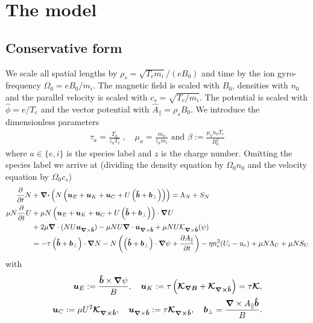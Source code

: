\section{The model} \label{sec:model}
\subsection{Conservative form}
We scale all spatial lengths by $\rho_s = \sqrt{T_e m_i}/(eB_0)$ and time by the ion gyro-frequency $\Omega_0 = eB_0/m_i$.
The magnetic field is scaled with $B_0$, densities with $n_0$ and the parallel velocity is scaled with $c_s = \sqrt{T_e/m_i}$.
The potential is scaled with $\hat \phi = e/T_e$ and the vector potential with
$\hat A_\parallel = \rho_s B_0$.
We introduce the dimensionless parameters
\begin{align}
  \tau_a = \frac{T_a}{z_aT_e}~,\quad \mu_a = \frac{m_a}{z_am_i}\text{ and }
  \beta:=\frac{\mu_0 n_0 T_e}{B_0^2}
  \label{}
\end{align}
where $a\in\{e,i\}$ is the species label and $z$ is the charge number.
Omitting the species label we arrive at (dividing the density equation by $\Omega_0n_0$ and the velocity equation by $\Omega_0 c_s$)
\begin{align}
\frac{\partial}{\partial t} N &+ {\boldsymbol{{\boldsymbol{\nabla}}\cdot}}\left( N \left(
    {\boldsymbol{u}}_E + {\boldsymbol{u}}_K + {\boldsymbol{u}}_{C} + U\left(\bm{\hat{b}} + {{\boldsymbol{b}}}_\perp\right)\right)\right) = \Lambda_N + S_N \\
\mu N \frac{\partial}{\partial t} U &+ \mu N \left(
    {\boldsymbol{u}}_E + {\boldsymbol{u}}_K + {\boldsymbol{u}}_{C} + U\left(\bm{\hat{b}} + {{\boldsymbol{b}}}_\perp\right)
    \right)\cdot{\boldsymbol{\nabla}} U  \nonumber \\
    &+ 2\mu {\boldsymbol{\nabla}}\cdot ( NU {\boldsymbol{u}}_{{\boldsymbol{\nabla}}\times\bm{\hat{b}}})
    -\mu NU{\boldsymbol{\nabla}}\cdot {\boldsymbol{u}}_{{\boldsymbol{\nabla}}\times\bm{\hat{b}}}
    + \mu NU\mathcal K_{{\boldsymbol{\nabla}}\times\bm{\hat{b}}}(\psi) \nonumber\\
    &= -\tau \left(\bm{\hat{b}} + {{\boldsymbol{b}}}_\perp\right)\cdot{\boldsymbol{\nabla}} N
    -N \left( \left(\bm{\hat{b}}+{{\boldsymbol{b}}}_\perp\right)\cdot{\boldsymbol{\nabla}} \psi + \frac{\partial A_\parallel}{\partial t}\right)
    - \eta n_e^2(U_i-u_e) + \mu N\Lambda_U + \mu N S_U
\label{}
\end{align}
with
\begin{align}
{\boldsymbol{u}}_E := \frac{\bm{\hat{b}}\times{\boldsymbol{\nabla}}\psi}{B},\quad
{\boldsymbol{u}}_{K} := \tau \left({\boldsymbol{\mathcal K_{{\boldsymbol{\nabla}} B}}} + {\boldsymbol{\mathcal K_{{\boldsymbol{\nabla}}\times\bm{\hat{b}}}}}\right)=\tau{\boldsymbol{\mathcal K}}  ,\nonumber\\
{\boldsymbol{u}}_C := \mu U^2{\boldsymbol{\mathcal K_{{\boldsymbol{\nabla}}\times\bm{\hat{b}}}}},\quad
{\boldsymbol{u}}_{{\boldsymbol{\nabla}}\times\bm{\hat{b}}} := \tau{\boldsymbol{\mathcal K_{{\boldsymbol{\nabla}}\times\bm{\hat{b}}}}},\quad
{{\boldsymbol{b}}}_\perp = \frac{{\boldsymbol{\nabla}}\times A_\parallel \bm{\hat{b}}}{B}.
\label{}
\end{align}

